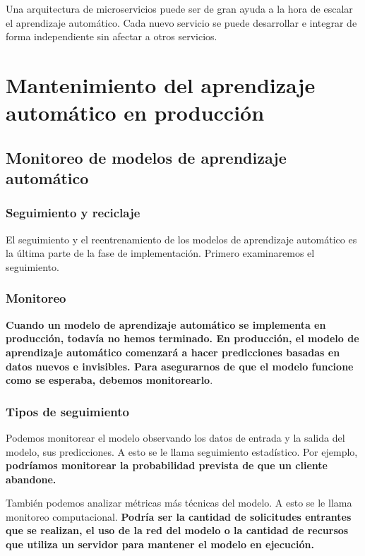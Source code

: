 \documentclass[10pt]{book}
\begin{document}
Una arquitectura de microservicios puede ser de gran ayuda a la hora de escalar el aprendizaje automático. Cada nuevo servicio se puede desarrollar e integrar de forma independiente sin afectar a otros servicios.

\section{Mantenimiento del aprendizaje automático en producción}

\subsection{Monitoreo de modelos de aprendizaje automático}

\subsubsection{Seguimiento y reciclaje}
El seguimiento y el reentrenamiento de los modelos de aprendizaje automático es la última parte de la fase de implementación. Primero examinaremos el seguimiento.

\subsubsection{Monitoreo}
\textbf{Cuando un modelo de aprendizaje automático se implementa en producción, todavía no hemos terminado. En producción, el modelo de aprendizaje automático comenzará a hacer predicciones basadas en datos nuevos e invisibles. Para asegurarnos de que el modelo funcione como se esperaba, debemos monitorearlo}.

\subsubsection{Tipos de seguimiento}
Podemos monitorear el modelo observando los datos de entrada y la salida del modelo, sus predicciones. A esto se le llama seguimiento estadístico. Por ejemplo, \textbf{podríamos monitorear la probabilidad prevista de que un cliente abandone.}

También podemos analizar métricas más técnicas del modelo. A esto se le llama monitoreo computacional. \textbf{Podría ser la cantidad de solicitudes entrantes que se realizan, el uso de la red del modelo o la cantidad de recursos que utiliza un servidor para mantener el modelo en ejecución.}
\end{document}
